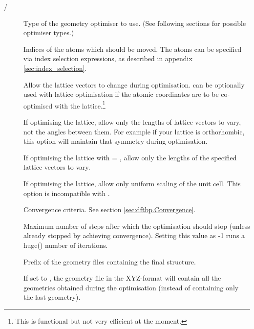 \begin{description}
\item[ / ] Type of the geometry optimiser to use. (See following sections for possible optimiser types.)

\item[] Indices of the atoms which should be moved. The
  atoms can be specified via index selection expressions, as described
  in appendix \ref{sec:index_selection}.

\item[] Allow the lattice vectors to change during
  optimisation.  can be optionally used with lattice
  optimisation if the atomic coordinates are to be co-optimised with
  the lattice.\footnote{This is functional but not very efficient at
    the moment.}

\item[] If optimising the lattice, allow only the
  lengths of lattice vectors to vary, not the angles between them. For
  example if your lattice is orthorhombic, this option will maintain
  that symmetry during optimisation.

\item[] If optimising the lattice with  =
  , allow only the lengths of the specified lattice vectors to
  vary.

\item[] If optimising the lattice, allow only uniform
  scaling of the unit cell. This option is incompatible with
  .

\item[] Convergence criteria. See section
  \ref{sec:dftbp.Convergence}.

\item[] Maximum number of steps after which the optimisation should
  stop (unless already stopped by achieving convergence). Setting this value as
  -1 runs a huge() number of iterations.

\item[] Prefix of the geometry files containing the
  final structure.

\item[] If set to , the geometry file in
  the XYZ-format will contain all the geometries obtained during the
  optimisation (instead of containing only the last geometry).

\end{description}

